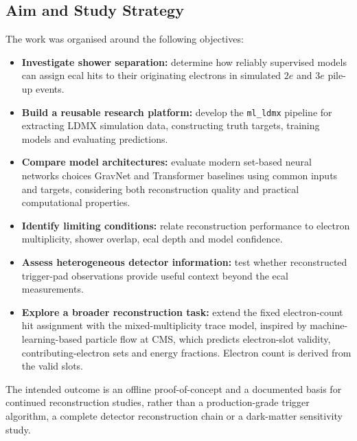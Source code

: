 \clearpage
\subsection{Aim and Study Strategy}

The work was organised around the following objectives:

\begin{itemize}
    \item \textbf{Investigate shower separation:} determine how reliably
    supervised models can assign \gls{ecal} hits to their originating electrons in
    simulated \(2e\) and \(3e\) pile-up events.

    \item \textbf{Build a reusable research platform:} develop the
    \texttt{ml\_ldmx} pipeline for extracting LDMX simulation data,
    constructing truth targets, training models and evaluating predictions.

    \item \textbf{Compare model architectures:} evaluate modern set-based neural networks choices GravNet and Transformer baselines using common inputs and targets, considering both
    reconstruction quality and practical computational properties.

    \item \textbf{Identify limiting conditions:} relate reconstruction
    performance to electron multiplicity, shower overlap, \gls{ecal} depth and model
    confidence.

    \item \textbf{Assess heterogeneous detector information:} test whether
    reconstructed trigger-pad observations provide useful context beyond the
    \gls{ecal} measurements.

    \item \textbf{Explore a broader reconstruction task:} extend the fixed electron-count hit assignment with the mixed-multiplicity \gls{trace} model, inspired by machine-learning-based particle flow at CMS, which predicts electron-slot validity, contributing-electron sets and energy fractions. Electron count is derived from the valid slots.
\end{itemize}

The intended outcome is an offline proof-of-concept and a documented basis for
continued reconstruction studies, rather than a production-grade trigger algorithm,
a complete detector reconstruction chain or a dark-matter sensitivity study.

\glsresetall
